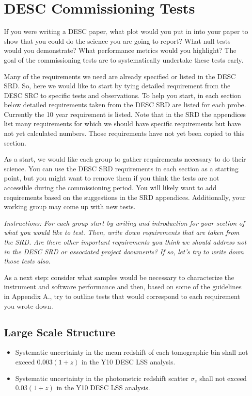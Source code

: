 \documentclass[modern]{desc-tex/styles/lsstdescnote}
\begin{document}
\section{DESC Commissioning Tests}

If you were writing a DESC paper, what plot would you put in into your paper to show that you could do the science you are going to report? What null tests would you demonstrate?  What performance metrics would you highlight?  The goal of the commissioning tests are to systematically undertake these tests early.

Many of the requirements we need are already specified or listed in the DESC SRD.  So, here we would like to start by tying detailed requirement from the DESC SRC to specific tests and observations. To help you start, in each section below detailed requirements taken from the DESC SRD are listed for each probe.  Currently the 10 year requirement is listed.  Note that in the SRD the appendices list many requirements for which we should have specific requirements but have not yet calculated numbers. Those requirements have not yet been copied to this section.

As a start, we would like each group to gather requirements necessary to do their science.  You can use the DESC SRD requirements in each section as a starting point, but you might want to remove them if you think the tests are not accessible during the commissioning period. You will likely want to add requirements based on the suggestions in the SRD appendices.  Additionally, your working group may come up with new tests.

{\it Instructions: For each group start by writing and introduction for your section of what you would like to test.  Then, write down requirements that are taken from the SRD.  Are there other important requirements you think we should address  not in the DESC SRD or associated project documents?  If so, let's try to write down those tests also.

As a next step: consider what samples would be necessary to characterize the instrument and software performance and then, based on some of the guidelines in Appendix A., try to outline tests that would correspond to each requirement you wrote down. }

\subsection{Large Scale Structure}

\begin{itemize}
\item Systematic uncertainty in the mean redshift of each tomographic bin shall not exceed $0.003 (1 + z)$ in the Y10 DESC LSS analysis.
\item Systematic uncertainty in the photometric redshift scatter $\sigma_z$ shall not exceed $0.03 (1 + z)$ in the Y10 DESC LSS analysis.
\end{itemize}
\end{document}
